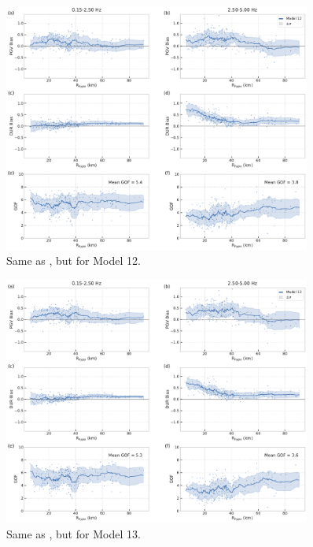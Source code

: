 \begin{figure}[!ht]
  \centering
  \includegraphics[width=0.9\textwidth,height=0.9\textheight,keepaspectratio]{figures/figure_highf_S22.pdf}
  \caption{Same as , but for Model 12.
  }
\label{fig:highf-A22}
\end{figure}
\clearpage


\begin{figure}[!ht]
  \centering
  \includegraphics[width=0.9\textwidth,height=0.9\textheight,keepaspectratio]{figures/figure_highf_S23.pdf}
  \caption{Same as , but for Model 13.
  }
\label{fig:highf-A23}
\end{figure}
\clearpage


